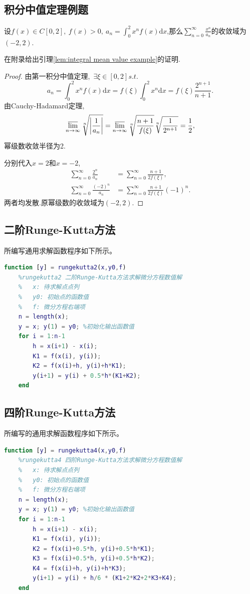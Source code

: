 \documentclass{GZUbachelorthesis}
\begin{document}
\subsection*{积分中值定理例题}
\begin{lem}\label{lem:integral mean value example}
    设$f(x) \in C[0,2],\ f(x) > 0,\ a_n = \int_{0}^{2}x^nf(x)\mathrm{d}x$,那么$\sum\limits_{n=0}^{\infty}\frac{x^n}{a_n}$的收敛域为$(-2,2)$.
\end{lem}
在附录给出引理\ref{lem:integral mean value example}的证明.
\begin{proof}
    由第一积分中值定理,\ $\exists \xi \in [0,2]s.t.$
    \[
        a_n = \int_{0}^{2}x^nf(x)\mathrm{d}x = f(\xi)\int_{0}^{2}x^n\mathrm{d}x = f(\xi)\frac{2^{n+1}}{n+1}.
    \]
    由Cauchy-Hadamard定理,
    \[
        \varlimsup_{n\to\infty} \sqrt[n]{\left|\frac{1}{a_n}\right|} = \varlimsup_{n\to\infty} \sqrt[n]{\frac{n+1}{f(\xi)}}\sqrt[n]{\frac{1}{2^{n+1}}} = \frac{1}{2},
    \]
    幂级数收敛半径为2.

    分别代入$x=2$和$x=-2$,
    \begin{align*}
        \sum_{n=0}^{\infty} \frac{2^n}{a_n} & = \sum_{n=0}^{\infty} \frac{n+1}{2f(\xi)},\\
        \sum_{n=0}^{\infty} \frac{(-2)^n}{a_n} & = \sum_{n=0}^{\infty} \frac{n+1}{2f(\xi)}(-1)^n.
    \end{align*}
    两者均发散.原幂级数的收敛域为$(-2,2)$.
\end{proof}

\subsection*{二阶Runge-Kutta方法}
所编写通用求解函数程序如下所示。
\begin{lstlisting}[language=matlab]
    function [y] = rungekutta2(x,y0,f)
    %rungekutta2 二阶Runge-Kutta方法求解微分方程数值解
    %   x: 待求解点点列
    %   y0: 初始点的函数值
    %   f: 微分方程右端项
    n = length(x);
    y = x; y(1) = y0; %初始化输出函数值
    for i = 1:n-1
        h = x(i+1) - x(i);
        K1 = f(x(i), y(i));
        K2 = f(x(i)+h, y(i)+h*K1);
        y(i+1) = y(i) + 0.5*h*(K1+K2);
    end
\end{lstlisting}

\subsection*{四阶Runge-Kutta方法}
所编写的通用求解函数程序如下所示。
\begin{lstlisting}[language=matlab]
    function [y] = rungekutta4(x,y0,f)
    %rungekutta4 四阶Runge-Kutta方法求解微分方程数值解
    %   x: 待求解点点列
    %   y0: 初始点的函数值
    %   f: 微分方程右端项
    n = length(x);
    y = x; y(1) = y0; %初始化输出函数值
    for i = 1:n-1
        h = x(i+1) - x(i);
        K1 = f(x(i), y(i));
        K2 = f(x(i)+0.5*h, y(i)+0.5*h*K1);
        K3 = f(x(i)+0.5*h, y(i)+0.5*h*K2);
        K4 = f(x(i)+h, y(i)+h*K3);
        y(i+1) = y(i) + h/6 * (K1+2*K2+2*K3+K4);
    end
\end{lstlisting}
\end{document}
